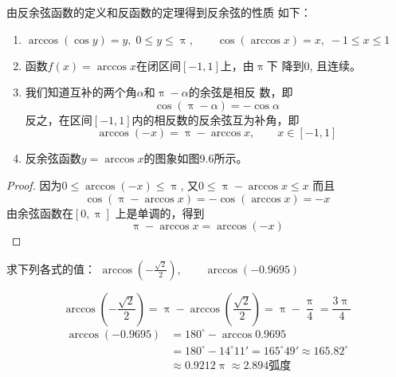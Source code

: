 由反余弦函数的定义和反函数的定理得到反余弦的性质
如下：
\begin{enumerate}
\item $\arccos(\cos y)=y,\; 0\leqslant y\leqslant \uppi,\qquad \cos(\arccos x)=x,\; -1\leqslant x\leqslant 1$
\item 函数$f(x)=\arccos x$在闭区间$[-1,1]$上，由$\uppi$下
降到0, 且连续。
\item 我们知道互补的两个角$\alpha$和$\uppi-\alpha$的余弦是相反
数，即
\[\cos(\uppi-\alpha)=-\cos\alpha\]
反之，在区间$[-1,1]$内的相反数的反余弦互为补角，即
\[\arccos(-x)=\uppi-\arccos x,\qquad x\in [-1,1]\]

\item 反余弦函数$y=\arccos x$的图象如图9.6所示。
\begin{figure}[htp]
    \centering
{}
    \caption{}
\end{figure}
\end{enumerate}

\begin{proof}
    因为$0\leqslant \arccos(-x)\leqslant \uppi$, 又$0\leqslant \uppi -\arccos x\leqslant x$
而且
\[\cos(\uppi -\arccos x)=-\cos(\arccos x)=-x\]
由余弦函数在$[0,\uppi]$ 上是单调的，得到
\[\uppi -\arccos x=\arccos (-x)\]
\end{proof}

\begin{example}
    求下列各式的值：
$\arccos\left(-\frac{\sqrt{2}}{2}\right),\qquad \arccos(-0.9695)$
\end{example}


\begin{solution}
\[\arccos\left(-\frac{\sqrt{2}}{2}\right)=\uppi-\arccos\left(\frac{\sqrt{2}}{2}\right)=\uppi-\frac{\uppi}{4}=\frac{3\uppi}{4}\]
\[\begin{split}
    \arccos(-0.9695)&=180^{\circ}-\arccos0.9695\\
    &=180^{\circ}-14^{\circ}11'=165^{\circ}49'\approx 165.82^{\circ}\\
    &\approx 0.9212\uppi\approx 2.894\text{弧度}
\end{split}\]
\end{solution}


